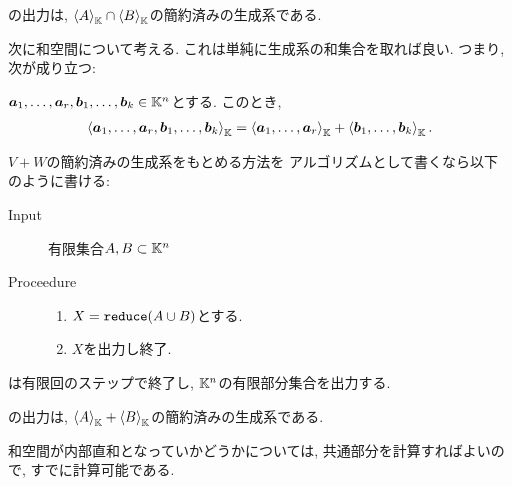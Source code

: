 \begin{prop}
  の出力は,
  $\Braket{A}_{\mathbb{K}}\cap \Braket{B}_{\mathbb{K}}$の簡約済みの生成系である.  
\end{prop}

次に和空間について考える.
これは単純に生成系の和集合を取れば良い.
つまり,
次が成り立つ:
\begin{prop}
  $\boldsymbol{a}_1,\ldots,\boldsymbol{a}_r,\boldsymbol{b}_1,\ldots,\boldsymbol{b}_k\in \mathbb{K}^n$とする.
  このとき,
  \begin{align*}
    \Braket{\boldsymbol{a}_1,\ldots,\boldsymbol{a}_r,\boldsymbol{b}_1,\ldots,\boldsymbol{b}_k}_{\mathbb{K}}
    =
    \Braket{\boldsymbol{a}_1,\ldots,\boldsymbol{a}_r}_{\mathbb{K}}+\Braket{\boldsymbol{b}_1,\ldots,\boldsymbol{b}_k}_{\mathbb{K}}.
  \end{align*}
\end{prop}
$V+W$の簡約済みの生成系をもとめる方法を
アルゴリズムとして書くなら以下のように書ける:
\begin{algorithm}\label{alg:joinspace}\makebox{}
\begin{description}
\item[Input]
  有限集合$A,B\subset \mathbb{K}^n$
\item[Proceedure]\makebox{}
  \begin{enumerate}
  \item
    $X=\operatorname{\texttt{reduce}}( A\cup B)$とする.
  \item
    $X$を出力し終了.
  \end{enumerate}
\end{description}
\end{algorithm}

\begin{prop}
  は有限回のステップで終了し,
  $\mathbb{K}^n$の有限部分集合を出力する.
\end{prop}

\begin{prop}
  の出力は,
  $\Braket{A}_{\mathbb{K}}+ \Braket{B}_{\mathbb{K}}$の簡約済みの生成系である.  
\end{prop}


和空間が内部直和となっていかどうかについては,
共通部分を計算すればよいので,
すでに計算可能である.

